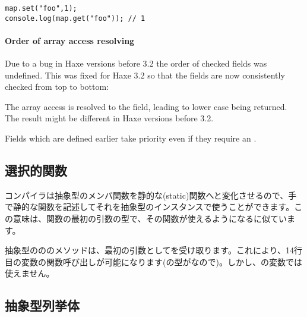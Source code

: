 \begin{lstlisting}
map.set("foo",1);
console.log(map.get("foo")); // 1
\end{lstlisting}

\paragraph{Order of array access resolving}
\label{types-abstract-array-access-order}

Due to a bug in Haxe versions before 3.2 the order of checked  fields was undefined. This was fixed for Haxe 3.2 so that the fields are now consistently checked from top to bottom:


The array access  is resolved to the  field, leading to lower case  being returned. The result might be different in Haxe versions before 3.2.

Fields which are defined earlier take priority even if they require an .


\subsection{選択的関数}
\label{types-abstract-selective-functions}

コンパイラは抽象型のメンバ関数を静的な(static)関数へと変化させるので、手で静的な関数を記述してそれを抽象型のインスタンスで使うことができます。この意味は、関数の最初の引数の型で、その関数が使えるようになるに似ています。


抽象型のののメソッドは、最初の引数としてを受け取ります。これにより、14行目の変数の関数呼び出しが可能になります(の型がなので)。しかし、の変数では使えません。



\subsection{抽象型列挙体}
\label{types-abstract-enum}

